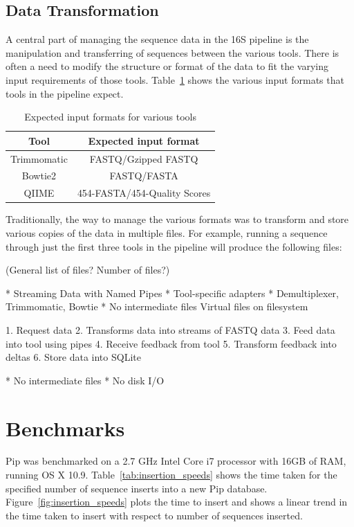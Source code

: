 \documentclass[12pt]{article}
\begin{document}
	\subsection{Data Transformation} %
	\label{sec:data_transformation}
	A central part of managing the sequence data in the 16S pipeline is the manipulation
	and transferring of sequences between the various tools. There is often a need
	to modify the structure or format of the data to fit the varying input requirements
	of those tools. Table~\ref{tab:expected_input} shows the various input formats that
	tools in the pipeline expect.

	\begin{table}
		\begin{tabular}{cc}
		\hline
		Tool & Expected input format\\
		\hline
		Trimmomatic & FASTQ/Gzipped FASTQ\\
		\hline
		Bowtie2 & FASTQ/FASTA\\
		\hline
		QIIME & 454-FASTA/454-Quality Scores\\
		\hline
		\end{tabular}
		\caption{Expected input formats for various tools}
		\label{tab:expected_input}
	\end{table}

	Traditionally, the way to manage the various formats was to transform and store
	various copies of the data in multiple files. For example, running a sequence through
	just the first three tools in the pipeline will produce the following files:

	(General list of files? Number of files?)


	* Streaming Data with Named Pipes
		* Tool-specific adapters
	* Demultiplexer, Trimmomatic, Bowtie
	* No intermediate files Virtual files on filesystem

	1. Request data
	2. Transforms data into streams of FASTQ data
	3. Feed data into tool using pipes
	4. Receive feedback from tool
	5. Transform feedback into deltas
	6. Store data into SQLite

	* No intermediate files
	* No disk I/O


\section{Benchmarks} %
\label{sec:benchmarks}
Pip was benchmarked on a 2.7 GHz Intel Core i7 processor with 16GB of RAM, running
OS X 10.9. Table~\ref{tab:insertion_speeds} shows the time taken for the specified number
of sequence inserts into a new Pip database. Figure~\ref{fig:insertion_speeds} plots the time 
to insert and shows a linear trend in the time taken to insert with respect to number
of sequences inserted.
\end{document}
